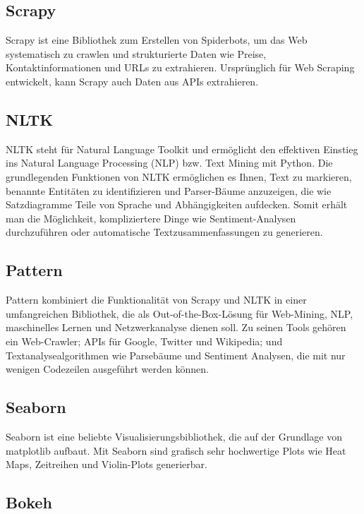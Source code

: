 \subsection{Scrapy}

Scrapy ist eine Bibliothek zum Erstellen von Spiderbots, um das Web systematisch zu crawlen und strukturierte Daten wie Preise, Kontaktinformationen und URLs zu extrahieren. Ursprünglich für Web Scraping entwickelt, kann Scrapy auch Daten aus APIs extrahieren.

\subsection{NLTK}

NLTK steht für Natural Language Toolkit und ermöglicht den effektiven Einstieg ins Natural Language Processing (NLP) bzw. Text Mining mit Python.
Die grundlegenden Funktionen von NLTK ermöglichen es Ihnen, Text zu markieren, benannte Entitäten zu identifizieren und Parser-Bäume anzuzeigen, die wie Satzdiagramme Teile von Sprache und Abhängigkeiten aufdecken. Somit erhält man die Möglichkeit, kompliziertere Dinge wie Sentiment-Analysen durchzuführen oder automatische Textzusammenfassungen zu generieren.

 
\subsection{Pattern}

Pattern kombiniert die Funktionalität von Scrapy und NLTK in einer umfangreichen Bibliothek, die als Out-of-the-Box-Lösung für Web-Mining, NLP, maschinelles Lernen und Netzwerkanalyse dienen soll. Zu seinen Tools gehören ein Web-Crawler; APIs für Google, Twitter und Wikipedia; und Textanalysealgorithmen wie Parsebäume und Sentiment Analysen, die mit nur wenigen Codezeilen ausgeführt werden können.

\subsection{Seaborn}

Seaborn ist eine beliebte Visualisierungsbibliothek, die auf der Grundlage von matplotlib aufbaut. Mit Seaborn sind grafisch sehr hochwertige Plots wie Heat Maps, Zeitreihen und Violin-Plots generierbar.

\subsection{Bokeh}

